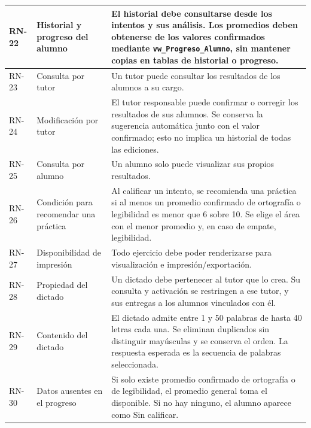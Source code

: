 \begin{longtable}{|>{\centering\arraybackslash}m{2cm}|m{3.6cm}|
  Y{\dimexpr\textwidth-5.6cm-6\arrayrulewidth\relax}|}
RN-22 & Historial y progreso del alumno &
El historial debe consultarse desde los intentos y sus análisis. Los promedios deben obtenerse de los valores confirmados mediante \texttt{vw\_Progreso\_Alumno}, sin mantener copias en tablas de historial o progreso. \\ \hline

RN-23 & Consulta por tutor &
Un tutor puede consultar los resultados de los alumnos a su cargo. \\ \hline

RN-24 & Modificación por tutor &
El tutor responsable puede confirmar o corregir los resultados de sus alumnos. Se conserva la sugerencia automática junto con el valor confirmado; esto no implica un historial de todas las ediciones. \\ \hline

RN-25 & Consulta por alumno &
Un alumno solo puede visualizar sus propios resultados. \\ \hline

RN-26 & Condición para recomendar una práctica &
Al calificar un intento, se recomienda una práctica si al menos un promedio confirmado de ortografía o legibilidad es menor que 6 sobre 10. Se elige el área con el menor promedio y, en caso de empate, legibilidad. \\ \hline

RN-27 & Disponibilidad de impresión &
Todo ejercicio debe poder renderizarse para visualización e impresión/exportación. \\ \hline

RN-28 & Propiedad del dictado &
Un dictado debe pertenecer al tutor que lo crea. Su consulta y activación se restringen a ese tutor, y sus entregas a los alumnos vinculados con él. \\ \hline

RN-29 & Contenido del dictado &
El dictado admite entre 1 y 50 palabras de hasta 40 letras cada una. Se eliminan duplicados sin distinguir mayúsculas y se conserva el orden. La respuesta esperada es la secuencia de palabras seleccionada. \\ \hline

RN-30 & Datos ausentes en el progreso &
Si solo existe promedio confirmado de ortografía o de legibilidad, el promedio general toma el disponible. Si no hay ninguno, el alumno aparece como Sin calificar. \\ \hline

\end{longtable}


